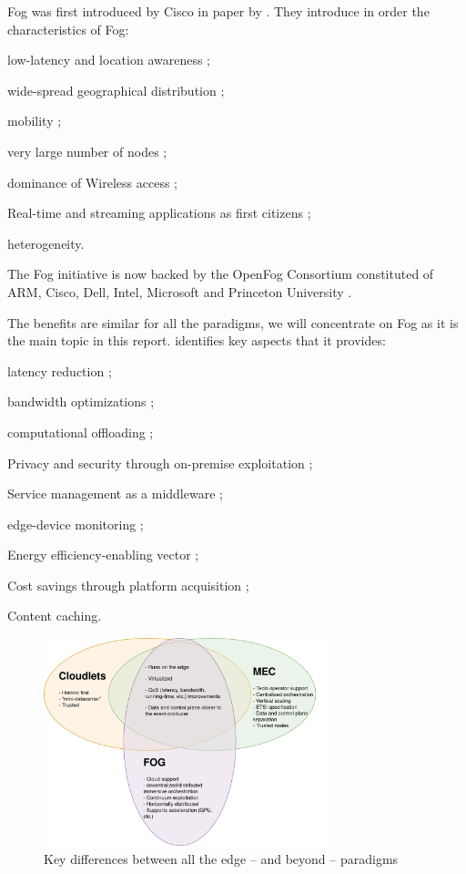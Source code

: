 \documentclass[11pt]{sdm}
\begin{document}
\begin{description}
	Fog was first introduced by Cisco in  paper by . They introduce in order the characteristics of Fog:
	\begin{enumerate*}[(i)]
		\item low-latency and location awareness ;
		\item wide-spread geographical distribution ;
		\item mobility ;
		\item very large number of nodes ;
		\item dominance of Wireless access ;
		\item Real-time and streaming applications as first citizens ;
		\item heterogeneity.
	\end{enumerate*}
	The Fog initiative is now backed by the OpenFog Consortium \cite{ieee_standards_association_ieee_2018} constituted of ARM, Cisco, Dell, Intel, Microsoft and Princeton University \cite{chiang_fog_2016}.
\end{description}

The benefits are similar for all the paradigms, we will concentrate on Fog as it is the main topic in this report. \citet{ahmed_fog_2019, ai_edge_2018} identifies key aspects that it provides:
\begin{enumerate*}[(1)]
	\item latency reduction ;
	\item bandwidth optimizations ;
	\item computational offloading ;
	\item Privacy and security through on-premise exploitation ;
	\item Service management as a middleware ;
	\item edge-device monitoring ;
	\item Energy efficiency-enabling vector ;
	\item Cost savings through platform acquisition ;
	\item Content caching.
\end{enumerate*}

\begin{figure}[t]
	\centering
	\includegraphics[width=0.75\textwidth]{./assets/CloudLetsVMECvFog.drawio.png}
	\caption{Key differences between all the edge -- and beyond -- paradigms}
	\label{fig:fogVall}
\end{figure}
\end{document}
